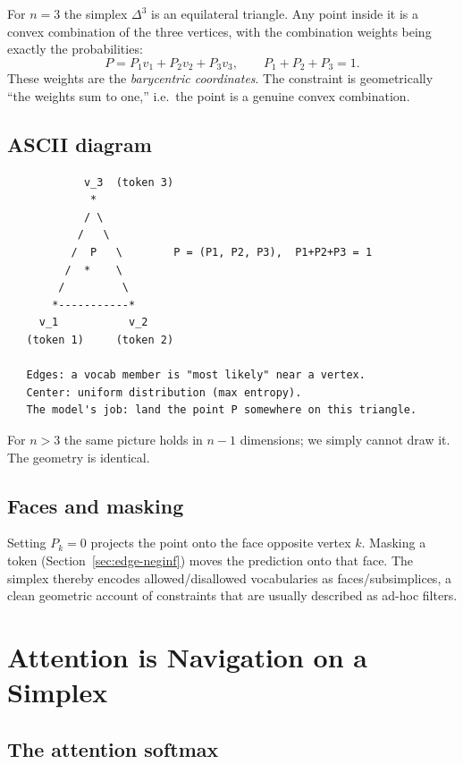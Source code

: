 \documentclass[11pt]{article}
\newcommand{\simplex}[1]{\Delta^{#1}}
\begin{document}
For $n=3$ the simplex $\simplex{3}$ is an equilateral triangle. Any point
inside it is a convex combination of the three vertices, with the combination
weights being exactly the probabilities:
\[
P = P_1 v_1 + P_2 v_2 + P_3 v_3,\qquad P_1+P_2+P_3=1.
\]
These weights are the \emph{barycentric coordinates}. The constraint is
geometrically ``the weights sum to one,'' i.e.\ the point is a genuine convex
combination.

\subsection{ASCII diagram}
\label{sec:poly-ascii}

\begin{verbatim}
            v_3  (token 3)
             *
            / \
           /   \
          /  P   \        P = (P1, P2, P3),  P1+P2+P3 = 1
         /  *    \
        /         \
       *-----------*
     v_1           v_2
   (token 1)     (token 2)

   Edges: a vocab member is "most likely" near a vertex.
   Center: uniform distribution (max entropy).
   The model's job: land the point P somewhere on this triangle.
\end{verbatim}

For $n>3$ the same picture holds in $n-1$ dimensions; we simply cannot draw it.
The geometry is identical.

\subsection{Faces and masking}
\label{sec:poly-faces}

Setting $P_k=0$ projects the point onto the face opposite vertex $k$. Masking a
token (Section~\ref{sec:edge-neginf}) moves the prediction onto that face. The
simplex thereby encodes allowed/disallowed vocabularies as faces/subsimplices,
a clean geometric account of constraints that are usually described as ad-hoc
filters.

\section{Attention is Navigation on a Simplex}
\label{sec:attention}

\subsection{The attention softmax}
\label{sec:att-soft}
\end{document}
